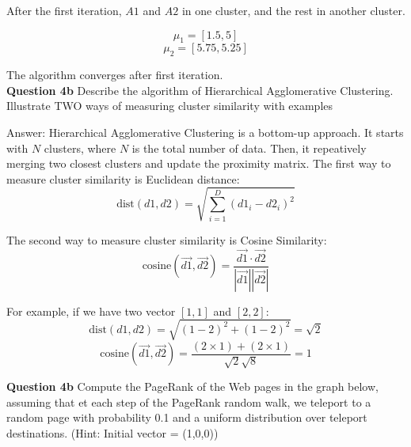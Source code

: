 \documentclass[11pt,a4paper]{report}
\begin{document}
\begin{multicols*}{2}

\noindent After the first iteration, $A1$ and $A2$ in one cluster, and the rest in another cluster.

$$\mu_1 = [1.5,5]$$
$$\mu_2 = [5.75, 5.25]$$


\noindent The algorithm converges after first iteration. \\

\noindent \textbf{Question 4b} Describe the algorithm of Hierarchical Agglomerative Clustering. Illustrate TWO ways of measuring cluster similarity with examples

\noindent Answer: Hierarchical Agglomerative Clustering is a bottom-up approach. It starts with $N$ clusters, where $N$ is the total number of data. Then, it repeatively merging two closest clusters and update the proximity matrix. The first way to measure cluster similarity is Euclidean distance:
$$\text{dist}(d1,d2)=\sqrt{\sum_{i=1}^D (d1_{i} - d2_{i})^2}$$

\noindent The second way to measure cluster similarity is Cosine Similarity: 
$$\text{cosine}(\vec{d1},\vec{d2}) = \frac{\vec{d1} \cdot \vec{d2}}{|\vec{d1}||\vec{d2}|}$$

\noindent For example, if we have two vector $[1,1]$ and $[2,2]$:
$$\text{dist}(d1,d2)=\sqrt{(1-2)^2 + (1-2)^2} = \sqrt{2}$$
$$\text{cosine}(\vec{d1},\vec{d2}) = \frac{(2\times 1) + (2\times 1)}{\sqrt{2}\sqrt{8}} = 1$$

\noindent \textbf{Question 4b} Compute the PageRank of the Web pages in the graph below, assuming that et each step of the PageRank random walk, we teleport to a random page with probability 0.1 and a uniform distribution over teleport destinations. (Hint: Initial vector = (1,0,0))


\end{multicols*}
\end{document}
